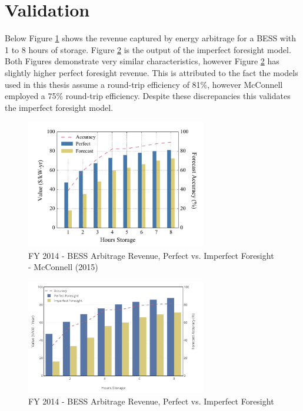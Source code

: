 \section{ Validation }
Below Figure \ref{fig:2014_imperfect_mcconncel} shows the revenue captured by energy arbitrage for a BESS with 1 to 8 hours of storage. Figure \ref{fig:2014_imperfect} is the output of the imperfect foresight model. Both Figures demonstrate very similar characteristics, however Figure \ref{fig:2014_imperfect} has slightly higher perfect foresight revenue. This is attributed to the fact the models used in this thesis assume a round-trip efficiency of 81\%, however McConnell employed a 75\% round-trip efficiency. Despite these discrepancies this validates the imperfect foresight model. 
\begin{center}
\begin{figure}[H]
  \caption{FY 2014 - BESS Arbitrage Revenue, Perfect vs. Imperfect Foresight - McConnell (2015)}
  \label{fig:2014_imperfect_mcconncel}
  \centering
\includegraphics[width=0.7\textwidth]{Pictures/Chapter4/2014_Comp_McCon.png}
\end{figure}
\begin{figure}[H]
  \caption{FY 2014 - BESS Arbitrage Revenue, Perfect vs. Imperfect Foresight }
  \label{fig:2014_imperfect}
  \centering
\includegraphics[width=0.7\textwidth]{Pictures/Chapter4/2014_Comp.png}
\end{figure}
\end{center}
